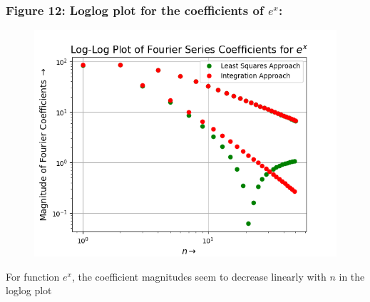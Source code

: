 \documentclass[12pt, a4paper]{article}
\begin{document}
\subsubsection{Figure 12: Loglog plot for the coefficients of $e^{x}$:}
\vspace*{-0.5cm}
\begin{figure}[H]
    \centering
    \includegraphics[scale = 0.75]{Figure_12.png}
    \label{fig:sample}
\end{figure}
\vspace*{-0.5cm}
\begin{center}
    For function $e^{x}$, the coefficient magnitudes seem to decrease linearly with $n$ in the loglog plot
\end{center}
\end{document}
